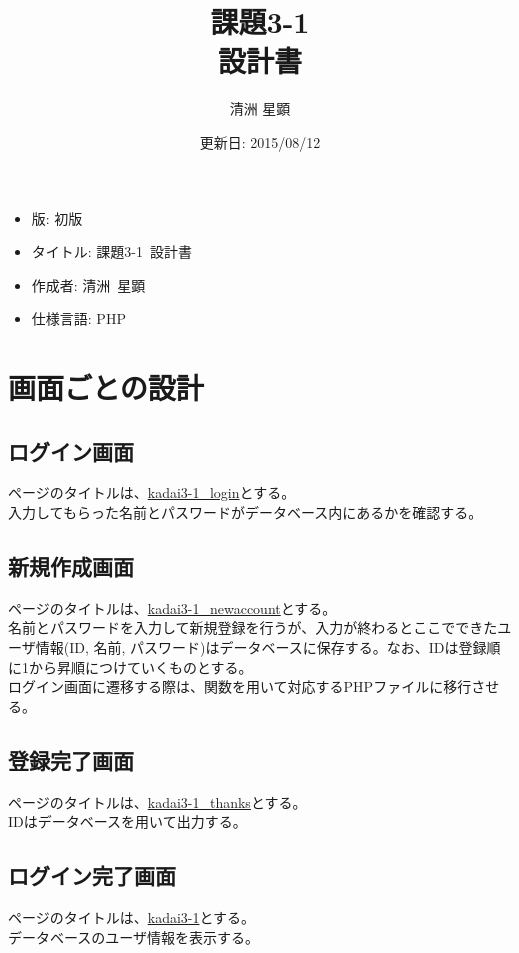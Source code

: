 \documentclass[a4paper,11pt]{jsarticle}
\title{課題3-1\\設計書}
\author{清洲 星顕}
\date{更新日: 2015/08/12}
\begin{document}
\maketitle
\begin{itemize}
    \item 版: 初版
    \item タイトル: 課題3-1~設計書
    \item 作成者: 清洲~星顕
    \item 仕様言語: PHP
\end{itemize}

\section*{画面ごとの設計}
\subsection*{ログイン画面}
ページのタイトルは、\underline{kadai3-1\_login}とする。\\
入力してもらった名前とパスワードがデータベース内にあるかを確認する。
\subsection*{新規作成画面}
ページのタイトルは、\underline{kadai3-1\_newaccount}とする。\\
名前とパスワードを入力して新規登録を行うが、入力が終わるとここでできたユーザ情報(ID, 名前, パスワード)はデータベースに保存する。なお、IDは登録順に1から昇順につけていくものとする。\\
ログイン画面に遷移する際は、関数を用いて対応するPHPファイルに移行させる。
\subsection*{登録完了画面}
ページのタイトルは、\underline{kadai3-1\_thanks}とする。\\
IDはデータベースを用いて出力する。
\subsection*{ログイン完了画面}
ページのタイトルは、\underline{kadai3-1}とする。\\
データベースのユーザ情報を表示する。
\end{document}
